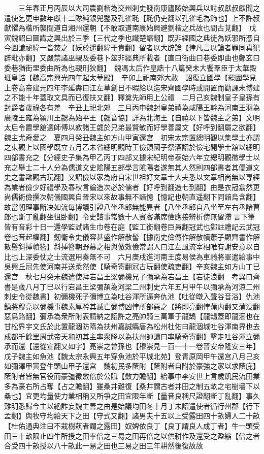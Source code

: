 　　三年春正月丙辰以大司農劉楷為交州刺史發南康廬陵始興兵以討叔獻叔獻聞之遣使乞更申數年獻十二隊純銀兜鍪及孔雀毦【毦仍吏翻以孔雀毛為飾也】上不許叔獻懼為楷所襲間道自湘州還朝【不敢取道南康始興避劉楷之兵故也間古莧翻】　戊寅魏詔曰圖䜟之興出於三季【三代之季也䜟楚譖翻】既非經國之典徒為妖邪所憑自今圖䜟祕緯一皆焚之【妖於遥翻緯于貴翻】留者以大辟論【律凡言以論者罪同真犯辟毗亦翻】又嚴禁諸巫覡及委巷卜筮非經典所載者【直曰街曲曰巷委即曲也鄭玄曰委巷猶街里委曲所為也覡刑狄翻】　魏馮太后作皇誥十八篇癸未大饗羣臣于太華殿班皇誥【魏高宗興光四年起太華殿】　辛卯上祀南郊大赦　詔復立國學【罷國學見上卷高帝建元四年李延夀曰江左草創日不暇給以迄宋齊國學時或開置而勸課未博建之不能十年蓋取文具而已復扶又翻】釋奠先師用上公禮　二月己亥魏制皇子皇孫有封爵者歲祿各有差　辛丑上祀北郊　三月丙申魏封皇弟禧為咸陽王幹為河南王羽為廣陵王雍為潁川王勰為始平王【勰音協】詳為北海王【自禧以下皆魏主之弟】文明太后令置學舘選師傅以教諸王勰於兄弟最賢敏而好學善屬文【好呼到翻屬之欲翻】魏主尤奇愛之　夏四月癸丑魏主如方山甲寅還宫　初宋太宗置總明觀以集學士亦謂之東觀上以國學既立五月乙未省總明觀時王儉領國子祭酒詔於儉宅開學士舘以總明四部書充之【分經史子集為甲乙丙丁四部又據宋紀明帝泰始六年立總明觀徵學士以充之舉士二十人分為儒道文史隂陽五部學言隂陽者遂無其人然則四部書者其儒道文史之書歟觀古玩翻】又詔儉以家為府自宋世祖好文章士大夫悉以文章相尚無以專經為業者儉少好禮學及春秋言論造次必於儒者【好呼到翻造七到翻】由是衣冠翕然更尚儒術儉撰次朝儀國興自晉宋以來故事無不諳憶【憶記也朝直遥翻下同諳烏含翻】故當朝理事斷决如流每博議引證八坐丞郎無能異者【八坐丞郎自八坐至左右丞諸曹郎也斷丁亂翻坐徂卧翻】令史諮事常數十人賓客滿席儉應接辨析傍無留滯言下筆皆有音彩十日一還學監試諸生巾卷在庭【監工銜翻卷巨員翻冠武也鄭註禮記云武冠卷也音起權翻】劒衛令史儀容甚盛作解散髻【據南史儉傳作解散幘蕭子顯齊書作解散髻斜挿幘簪】斜挿簪朝野慕之相與倣效儉常謂人曰江左風流宰相唯有謝安意以自比也上深委仗之士流選用奏無不可　六月庚戌進河南王度易侯為車騎將軍遣給事中吳興丘冠先使河南并送柔然使【騎奇寄翻冠古玩翻使疏吏翻】辛亥魏主如方山丁巳還宫　秋七月癸未魏遣使拜宕昌王梁彌機兄子彌承為宕昌王【宕徒浪翻　考異曰齊書是歲八月丁巳以行宕昌王梁彌頡為河梁二州刺史六年五月甲午以彌承為河涼二州刺史令從魏書】初彌機死子彌博立為吐谷渾所逼奔仇池【吐從暾入聲谷音浴】仇池鎮將穆亮以彌機事魏素厚矜其滅亡彌博凶悖所部惡之【將即亮翻悖蒲内翻又蒲没翻惡烏路翻】彌承為衆所附表請納之詔許之亮帥騎三萬軍于龍鵠【龍鵠蓋即龍涸也在甘松界宇文氏於此置龍涸防隋為扶州嘉誠縣唐為松州杜佑曰龍涸城吐谷渾南界也去成都千餘里周武帝天和初其主率衆降以為扶州帥讀曰率騎奇寄翻】擊走吐谷渾立彌承而還【還從宣翻又如字】亮崇之曾孫也【穆崇見一百一十一卷晉安帝隆安三年】　戊子魏主如魚池【魏太宗永興五年穿魚池於平城北苑】登青原岡甲午還宫八月己亥如彌澤甲寅登牛頭山甲子還宫　魏初民多䕃附【䕃附者自附於豪強之家以求䕃庇】䕃附者皆無官役而豪彊徵斂倍於公賦【斂力贍翻】給事中李安世上言歲飢民流田業多為豪右所占奪【占之贍翻】雖桑井難復【桑井謂古者井田之制五畝之宅樹墻下以桑也】宜更均量使力業相稱又所爭之田宜限年斷【量音良稱尺證翻斷丁亂翻】事久難明悉歸今主以絶詐妄魏主善之由是始議均田冬十月丁未詔遣使者循行州郡【行下孟翻】與牧守均給天下之田【守式又翻】諸男夫十五以上受露田四十畝婦人二十畝【杜佑通典注曰不栽樹萟者謂之露田】奴婢依良丁【良丁謂良人成丁者】牛一頭受田三十畝限止四牛所授之田率倍之三易之田再倍之以供耕作及還受之盈縮【倍之者合受四十畝授以八十畝此一易之田也三易之田三年耕然後復故故